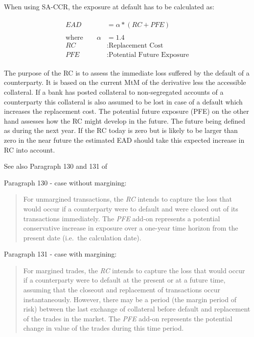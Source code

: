 \documentclass[../Thesis_AHoecherl.tex]{subfiles}
\begin{document}
When using \gls{SA-CCR}, the exposure at default has to be
calculated as:

\begin{align}
	\begin{split}
		EAD &= \alpha * (RC + PFE)\\
		\\
		\text{where} \qquad \alpha&=1.4 \\
		RC&: \text{Replacement Cost} \\
		PFE&: \text{Potential Future Exposure}
	\end{split}
	\label{eq:SA-CCR EAD}
\end{align}

The purpose of the RC is to assess the immediate loss suffered by the
default of a counterparty. It is based on the current \gls{MtM} of the
derivative less the accessible collateral. If a bank has posted
collateral to non-segregated accounts of a counterparty this collateral
is also assumed to be lost in case of a default which increases the
replacement cost.
The potential future exposure (PFE) on the other hand assesses how the
RC might develop in the future. The future being defined as during the
next year. If the RC today is zero but is likely to be larger than zero in the
near future the estimated \gls{EAD} should take this expected increase in RC
into account.

See also Paragraph 130 and 131 of \cite{SACCR}

    Paragraph 130 - case without margining:

\begin{quote}
For unmargined transactions, the \emph{RC} intends to capture the loss
that would occur if a counterparty were to default and were closed out
of its transactions immediately. The \emph{PFE} add-on represents a
potential conservative increase in exposure over a one-year time horizon
from the present date (i.e.~the calculation date).
\end{quote}

Paragraph 131 - case with margining:

\begin{quote}
For margined trades, the \emph{RC} intends to capture the loss that
would occur if a counterparty were to default at the present or at a
future time, assuming that the closeout and replacement of transactions
occur instantaneously. However, there may be a period (the margin period
of risk) between the last exchange of collateral before default and
replacement of the trades in the market. The \emph{PFE} add-on
represents the potential change in value of the trades during this time
period.
\end{quote}
\end{document}
